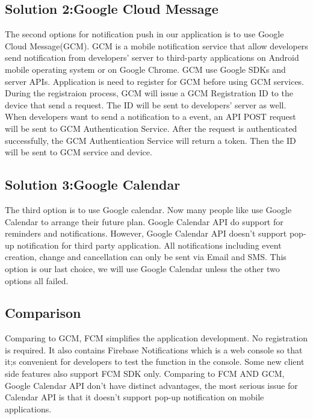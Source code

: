 \documentclass[letterpaper, 10pt,titlepage]{article}
\begin{document}
\subsection{Solution 2:Google Cloud Message}
The second options for notification push in our application is to use Google Cloud Message(GCM). GCM is a mobile notification service that allow developers send notification from developers' server to third-party applications on Android mobile operating system or on Google Chrome. GCM use Google SDKs and server APIs. Application is need to register for GCM before using GCM services. During the registraion process, GCM will issue a GCM Registration ID to the device that send a request. The ID will be sent to developers' server as well. When developers want to send a notification to a event, an API POST request will be sent to GCM Authentication Service. After the request is authenticated successfully, the GCM Authentication Service will return a token. Then the ID will be sent to GCM service and device.\cite{googlecloudmessage}\\


\subsection{Solution 3:Google Calendar}
The third option is to use Google calendar. Now many people like use Google Calendar to arrange their future plan. Google Calendar API do support for reminders and notifications. However, Google Calendar API doesn't support pop-up notification for third party application. All notifications including event creation, change and cancellation can only be sent via Email and SMS. This option is our last choice, we will use Google Calendar unless the other two options all failed.\cite{googlecalendarapi}\\

\subsection{Comparison}
Comparing to GCM, FCM simplifies the application development. No registration is required. It also contains Firebase Notifications which is a web console so that it;s convenient for developers to test the function in the console. Some new client side features also support FCM SDK only. Comparing to FCM AND GCM, Google Calendar API don't have distinct advantages, the most serious issue for Calendar API is that it doesn't support pop-up notification on mobile applications.\\
\end{document}
